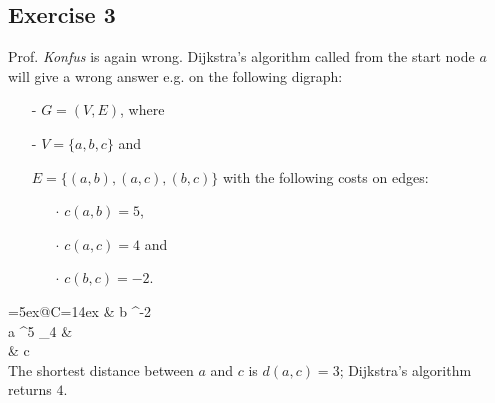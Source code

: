 \documentclass[english]{article}
\begin{document}
\subsection*{Exercise 3}
Prof. {\em Konfus} is again wrong. 
Dijkstra's algorithm called from the start node $a$
will give a wrong answer e.g. on the following digraph:
\begin{itemize}
\item[-]$G=(V,E)$, where
\item[-]$V=\{a,b,c\}$ and
\item[] $E=\{(a,b),(a,c),(b,c)\}$ with the following costs on edges:
\begin{itemize}
\item[$\cdot$] $c(a,b)=5$,
\item[$\cdot$] $c(a,c)=4$ and
\item[$\cdot$] $c(b,c)=-2$.
\end{itemize} 
\end{itemize}
\xymatrix@R=5ex@C=14ex{
& b \ar[dd]^{-2} \\
a \ar[ur]^5 \ar[dr]_4 & \\
& c 
  }
\mbox{}\\[2mm]
The shortest distance between 
$a$ and $c$ is $d(a,c)=3$; Dijkstra's algorithm returns $4$.
\end{document}
